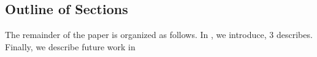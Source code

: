 \subsection{Outline of Sections}


The remainder of the paper is organized as follows. In , we
introduce,   3 describes.  Finally, we describe future work
in 
